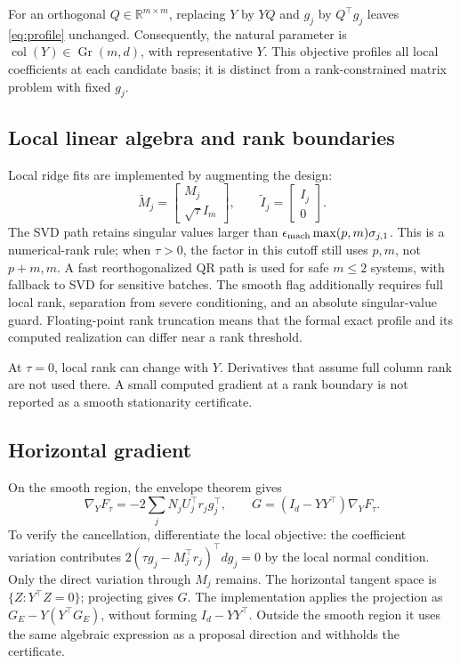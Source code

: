 \documentclass[11pt,a4paper]{article}
\newcommand{\R}{\mathbb R}
\newcommand{\col}{\operatorname{col}}
\newcommand{\Gr}{\operatorname{Gr}}
\begin{document}
For an orthogonal $Q\in\R^{m\times m}$, replacing $Y$ by $YQ$ and
$g_j$ by $Q^\top g_j$ leaves \eqref{eq:profile} unchanged. Consequently,
the natural parameter is $\col(Y)\in\Gr(m,d)$, with representative $Y$.
This objective profiles all local coefficients at each candidate basis;
it is distinct from a rank-constrained matrix problem with fixed $g_j$.

\subsection{Local linear algebra and rank boundaries}
Local ridge fits are implemented by augmenting the design:
\begin{equation}
 \widetilde M_j=\begin{bmatrix}M_j\\\sqrt\tau I_m\end{bmatrix},\qquad
 \widetilde I_j=\begin{bmatrix}I_j\\0\end{bmatrix}.
\end{equation}
The SVD path retains singular values larger than
$\epsilon_{\rm mach}\max(p,m)\sigma_{j,1}$. This is a numerical-rank rule;
when $\tau>0$, the factor in this cutoff still uses $p,m$, not $p+m,m$.
A fast reorthogonalized QR path is used for safe $m\le2$ systems, with
fallback to SVD for sensitive batches. The smooth flag additionally
requires full local rank, separation from severe conditioning, and an
absolute singular-value guard. Floating-point rank truncation means that
the formal exact profile and its computed realization can differ near
a rank threshold.

At $\tau=0$, local rank can change with $Y$. Derivatives that assume full
column rank are not used there. A small computed gradient at a rank boundary
is not reported as a smooth stationarity certificate.

\subsection{Horizontal gradient}
On the smooth region, the envelope theorem gives
\begin{equation}\label{eq:gradient}
 \nabla_YF_\tau=-2\sum_jN_jU_j^\top r_jg_j^\top,
 \qquad G=(I_d-YY^\top)\nabla_YF_\tau.
\end{equation}
To verify the cancellation, differentiate the local objective:
the coefficient variation contributes
$2(\tau g_j-M_j^\top r_j)^\top dg_j=0$ by the local normal condition.
Only the direct variation through $M_j$ remains. The horizontal tangent
space is $\{Z:Y^\top Z=0\}$; projecting gives $G$.
The implementation applies the projection as $G_E-Y(Y^\top G_E)$,
without forming $I_d-YY^\top$. Outside the smooth region it uses the same
algebraic expression as a proposal direction and withholds the certificate.
\end{document}
